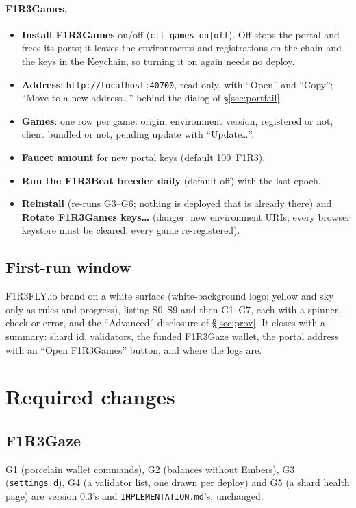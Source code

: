 \documentclass[11pt]{article}
\theoremstyle{definition}
\theoremstyle{remark}
\newcommand{\code}[1]{\texttt{#1}}
\newcommand{\Gz}{F1R3Gaze}
\newcommand{\Gm}{F1R3Games}
\newcommand{\Em}{Embers}
\begin{document}
\paragraph{\Gm{}.}
\begin{itemize}[nosep]
\item \textbf{Install \Gm{}} on/off (\code{ctl games on|off}). Off stops the portal
  and frees its ports; it leaves the environments and registrations on the chain and
  the keys in the Keychain, so turning it on again needs no deploy.
\item \textbf{Address}: \code{http://localhost:40700}, read-only, with ``Open'' and
  ``Copy''; ``Move to a new address\ldots'' behind the dialog of \S\ref{sec:portfail}.
\item \textbf{Games}: one row per game: origin, environment version, registered or
  not, client bundled or not, pending update with ``Update\ldots''.
\item \textbf{Faucet amount} for new portal keys (default 100~F1R3).
\item \textbf{Run the F1R3Beat breeder daily} (default off) with the last epoch.
\item \textbf{Reinstall} (re-runs G3--G6; nothing is deployed that is already there)
  and \textbf{Rotate \Gm{} keys\ldots} (danger: new environment URIs; every browser
  keystore must be cleared, every game re-registered).
\end{itemize}

\subsection{First-run window}
F1R3FLY.io brand on a white surface (white-background logo; yellow and sky only as
rules and progress), listing S0--S9 and then G1--G7, each with a spinner, check or
error, and the ``Advanced'' disclosure of \S\ref{sec:prov}. It closes with a summary:
shard id, validators, the funded \Gz{} wallet, the portal address with an
``Open \Gm{}'' button, and where the logs are.

\section{Required changes}\label{sec:wp}

\subsection{\Gz{}}
G1 (porcelain wallet commands), G2 (balances without \Em{}), G3 (\code{settings.d}),
G4 (a validator list, one drawn per deploy) and G5 (a shard health page) are
version 0.3's and \code{IMPLEMENTATION.md}'s, unchanged.
\end{document}
